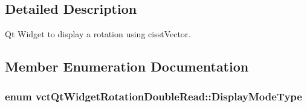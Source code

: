 \subsection{Detailed Description}
Qt Widget to display a rotation using cisst\-Vector. 

\subsection{Member Enumeration Documentation}
\hypertarget{classvct_qt_widget_rotation_double_read_a77ae5a0ee5fe231ad2f9dd020aad434c}{
\subsubsection[{Display\-Mode\-Type}]{\setlength{\rightskip}{0pt plus 5cm}enum {\bf vct\-Qt\-Widget\-Rotation\-Double\-Read\-::\-Display\-Mode\-Type}}}\label{classvct_qt_widget_rotation_double_read_a77ae5a0ee5fe231ad2f9dd020aad434c}
